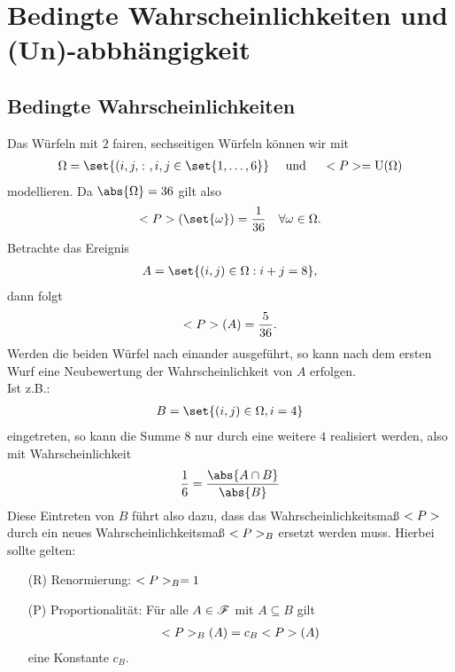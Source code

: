 \chapter{Bedingte Wahrscheinlichkeiten und (Un)-abbhängigkeit}

\section{Bedingte Wahrscheinlichkeiten}

\begin{example}
	Das Würfeln mit $2$ fairen, sechseitigen Würfeln können wir mit 
	\begin{align}
		\Omega = \set{(i,j, \colon, i,j \in \set{1,\dots,6}} \quad \und \quad \probp = \Gleich(\Omega) \notag
    \end{align}
    modellieren. Da $\abs{\Omega} = 36$ gilt also
   	\begin{align}
		\probp(\set{\omega}) = \frac{1}{36} \quad \forall \omega \in \Omega.\notag
	\end{align}
	Betrachte das Ereignis
	\begin{align}
		A = \set{(i,j) \in \Omega : i + j = 8},\notag
	\end{align}
	dann folgt
	\begin{align}
		<P>(A) = \frac{5}{36}.\notag
	\end{align}
	Werden die beiden Würfel nach einander ausgeführt, so kann nach dem ersten Wurf eine Neubewertung der Wahrscheinlichkeit von $A$ erfolgen.\\
	Ist z.B.:
	\begin{align}
		B = \set{(i,j) \in \Omega, i = 4}\notag
	\end{align}
	eingetreten, so kann die Summe $8$ nur durch eine weitere $4$ realisiert werden, also mit Wahrscheinlichkeit
	\begin{align}
		\frac{1}{6} = \frac{\abs{A \cap B}}{\abs{B}}\notag 
	\end{align}
	Diese Eintreten von $B$ führt also dazu, dass das Wahrscheinlichkeitsmaß $<P>$ durch ein neues Wahrscheinlichkeitsmaß $<P>_{B}$ ersetzt werden muss. Hierbei sollte gelten:
	\begin{itemize}
		\item[(R)] Renormierung: $<P>_{B} = 1$
		\item[(P)] Proportionalität: Für alle $A \in \mathscr{F}$ mit $A \subseteq B$ gilt
		\begin{align}
			<P>_{B}(A) = c_B <P>(A)\notag
		\end{align}
		eine Konstante $c_B$.
	\end{itemize}
\end{example}

